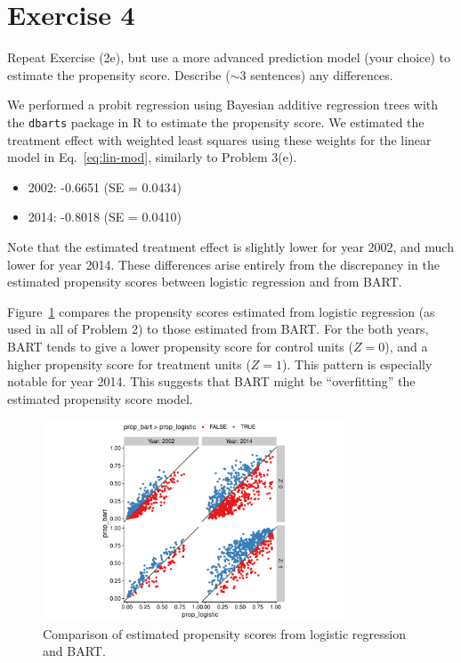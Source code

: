 
\section{Exercise 4}

\begin{quoting}
  Repeat Exercise (2e), but use a more advanced prediction model (your
  choice) to estimate the propensity score. Describe ($\sim$3
  sentences) any differences.
\end{quoting}

We performed a probit regression using Bayesian additive regression
trees \citep[BART;][]{chipman2010} with the \texttt{dbarts} package in
\textsf{R} to estimate the propensity score.  We estimated the
treatment effect with weighted least squares using these weights for
the linear model in Eq.~\eqref{eq:lin-mod}, similarly to Problem 3(e).
\begin{itemize}
\item 2002: -0.6651 (SE = 0.0434)
\item 2014: -0.8018 (SE = 0.0410) 
\end{itemize}

Note that the estimated treatment effect is slightly lower for year
2002, and much lower for year 2014.  These differences arise entirely
from the discrepancy in the estimated propensity scores between
logistic regression and from BART.

Figure~\ref{fig:prop-comp} compares the propensity scores estimated
from logistic regression (as used in all of Problem 2) to those
estimated from BART. For the both years, BART tends to give a lower
propensity score for control units ($Z=0$), and a higher propensity
score for treatment units ($Z=1$).  This pattern is especially notable
for year 2014.  This suggests that BART might be ``overfitting'' the
estimated propensity score model.

\begin{figure}[ht]
  \centering
  \includegraphics[width=0.8\textwidth]{figures/prop-comp}
  \caption{\label{fig:prop-comp} Comparison of estimated propensity scores from logistic regression and BART. }
\end{figure}


